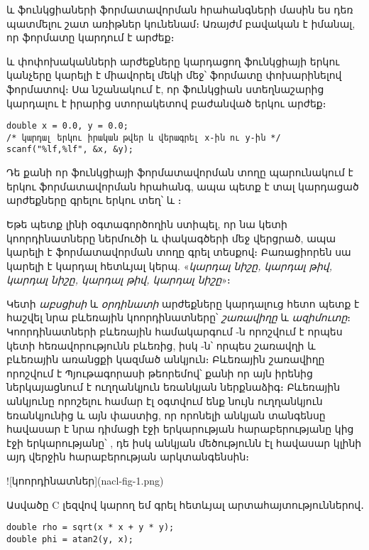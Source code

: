  և  ֆունկցիաների ֆորմատավորման հրահանգների
մասին ես դեռ պատմելու շատ առիթներ կունենամ։ Առայժմ բավական է իմանալ, որ
 ֆորմատը կարդում է  արժեք։

 և  փոփոխականների արժեքները կարդացող 
ֆունկցիայի երկու կանչերը կարելի է միավորել մեկի մեջ՝ 
ֆորմատը փոխարինելով  ֆորմատով։ Սա նշանակում է, որ
 ֆունկցիան ստեղնաշարից կարդալու է իրարից ստորակետով
բաժանված երկու  արժեք։

\begin{Verbatim}
double x = 0.0, y = 0.0;
/* կարդալ երկու իրական թվեր և վերագրել x-ին ու y-ին */
scanf("%lf,%lf", &x, &y);
\end{Verbatim}

Դե քանի որ  ֆունկցիայի ֆորմատավորման տողը պարունակում է
երկու ֆորմատավորման հրահանգ, ապա պետք է տալ կարդացած արժեքները գրելու
երկու տեղ՝  և ։

Եթե պետք լինի օգտագործողին ստիպել, որ նա կետի կոորդինատները ներմուծի
\code{(} և \code{)} փակագծերի մեջ վերցրած, ապա կարելի է
ֆորմատավորման տողը գրել  տեսքով։ Բառացիորեն սա
կարելի է կարդալ հետևյալ կերպ. «\emph{կարդալ \code{(} նիշը, կարդալ
 թիվ, կարդալ \code{,} նիշը, կարդալ  թիվ,
կարդալ \code{)} նիշը}»։

Կետի  \emph{աբսցիսի} և  \emph{օրդինատի} արժեքները
կարդալուց հետո պետք է հաշվել նրա բևեռային կոորդինատները՝ 
\emph{շառավիղը} և  \emph{ազիմուտը}։ Կոորդինատների բևեռային
համակարգում -ն որոշվում է որպես կետի հեռավորությունն բևեռից,
իսկ -ն՝ որպես շառավղի և բևեռային առանցքի կազմած անկյուն։
Բևեռային շառավիղը որոշվում է Պյութագորասի թեորեմով՝ քանի որ այն իրենից
ներկայացնում է ուղղանկյուն եռանկյան ներքնաձիգ։ Բևեռային անկյունը
որոշելու համար էլ օգտվում ենք նույն ուղղանկյուն եռանկյունից և այն
փաստից, որ որոնելի անկյան տանգենսը հավասար է նրա դիմացի էջի երկարության
հարաբերությանը կից էջի երկարությանը՝ , դե իսկ անկյան
մեծությունն էլ հավասար կլինի այդ վերջին հարաբերության արկտանգենսին։

![կոորդինատներ](nacl-fig-1.png)

Ասվածը C լեզվով կարող եմ գրել հետևյալ արտահայտություններով․

\begin{verbatim}
double rho = sqrt(x * x + y * y);
double phi = atan2(y, x);
\end{verbatim}

